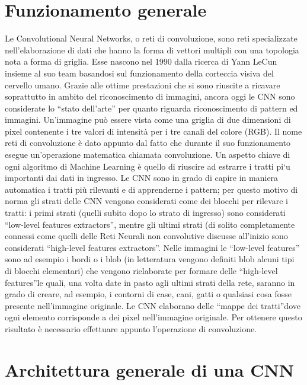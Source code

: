 \section{Funzionamento generale}
Le Convolutional Neural Networks, o reti di convoluzione, sono reti specializzate 
nell'elaborazione di dati che hanno la forma di vettori multipli con una topologia 
nota a forma di griglia. Esse nascono nel 1990 dalla ricerca di Yann LeCun 
insieme al suo team basandosi sul funzionamento della corteccia visiva del
 cervello umano. Grazie alle ottime prestazioni che si sono riuscite a ricavare 
 soprattutto in ambito del riconoscimento di immagini, ancora oggi le
CNN sono considerate lo “stato dell’arte” per quanto riguarda riconoscimento di
 pattern ed immagini. 
Un’immagine può essere vista come una griglia di due dimensioni di pixel 
contenente i tre valori di intensità per i tre canali del colore (RGB). 
Il nome reti di convoluzione è dato appunto dal fatto che durante il suo 
funzionamento esegue un’operazione matematica chiamata convoluzione. 
Un aspetto chiave di ogni algoritmo di Machine Learning è quello di riuscire
 ad estrarre i tratti pi`u importanti dai dati in ingresso. Le CNN sono 
 in grado di capire in maniera automatica i tratti più rilevanti e di apprenderne 
 i pattern; per questo motivo di norma gli strati delle CNN vengono considerati 
 come dei blocchi per rilevare i tratti: i primi strati (quelli subito dopo lo
  strato di ingresso) sono considerati “low-level features extractors”, mentre
   gli ultimi strati (di solito completamente connessi come quelli delle Reti 
   Neurali non convolutive discusse all’inizio sono considerati 
   “high-level features extractors”. Nelle immagini le “low-level features” sono
    ad esempio i bordi o i blob (in letteratura vengono definiti blob alcuni tipi
di blocchi elementari) che vengono rielaborate per formare delle “high-level
 features”le quali, una volta date in pasto agli ultimi strati della rete,
  saranno in grado di creare, ad esempio, i contorni di case, cani, gatti
   o qualsiasi cosa fosse presente nell’immagine originale. 
   Le CNN elaborano delle “mappe dei tratti”dove ogni elemento corrisponde
    a dei pixel nell’immagine originale. Per ottenere questo risultato è necessario
     effettuare appunto l’operazione di convoluzione.

\section{Architettura generale di una CNN}
